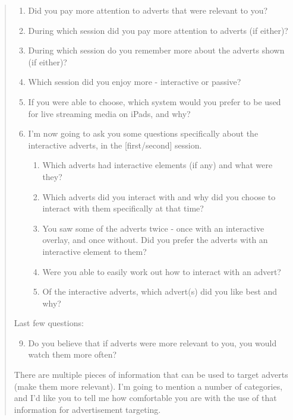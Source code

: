 \begin{quotation}
\begin{enumerate}
		\item Did you pay more attention to adverts that were relevant to you?
		\item During which session did you pay more attention to adverts (if either)?
		\item During which session do you remember more about the adverts shown (if either)?
		\item Which session did you enjoy more - interactive or passive?
		\item If you were able to choose, which system would you prefer to be used for live streaming media on iPads, and why?
		\item I'm now going to ask you some questions specifically about the interactive adverts, in the [first/second] session.
		\begin{enumerate}[label=\alph*]
			\item Which adverts had interactive elements (if any) and what were they?
			\item Which adverts did you interact with and why did you choose to interact with them specifically at that time?
			\item You saw some of the adverts twice - once with an interactive overlay, and once without. Did you prefer the adverts with an interactive element to them?
			\item Were you able to easily work out how to interact with an advert?
			\item Of the interactive adverts, which advert(s) did you like best and why?\\
		\end{enumerate}
	\end{enumerate}

	\noindent Last few questions:\\

	\begin{enumerate}
	  	\setcounter{enumi}{8}
		\item Do you believe that if adverts were more relevant to you, you would watch them more often?\\
	\end{enumerate}

	\noindent There are multiple pieces of information that can be used to target adverts (make them more relevant). I'm going to mention a number of categories, and I'd like you to tell me how comfortable you are with the use of that information for advertisement targeting.\\


\end{quotation}
